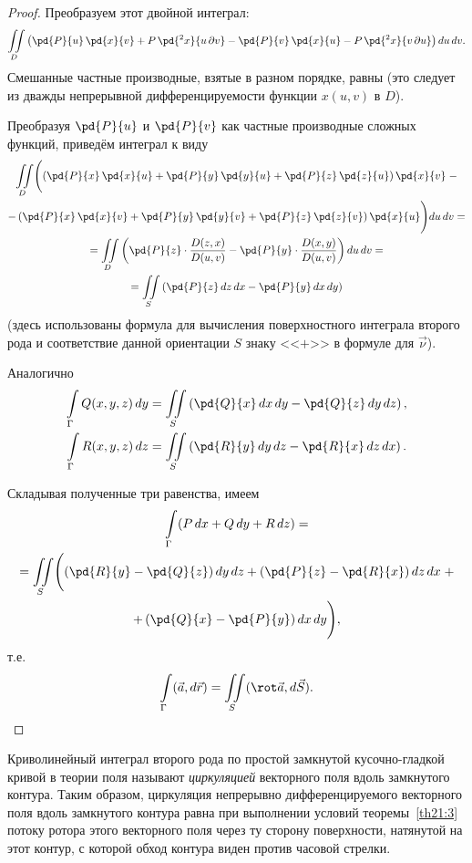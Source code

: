 \begin{proof}
Преобразуем этот двойной интеграл:
$$
\iint\limits_{D} \left(\pd{P}{u}\,\pd{x}{v} + P\,\pd{^2 x}{u\,\partial v} - \pd{P}{v}\,\pd{x}{u} - P\,\pd{^2 x}{v\,\partial u}\right) du\,dv.
$$
Смешанные частные производные, взятые в разном порядке, равны (это следует из дважды непрерывной дифференцируемости функции $x(u, v)$ в $D$).

Преобразуя $\pd{P}{u}$ и $\pd{P}{v}$ как частные производные сложных функций, приведём интеграл к виду
\begin{multline*}
\iint\limits_{D} \Biggl(\left(\pd{P}{x}\,\pd{x}{u} + \pd{P}{y}\,\pd{y}{u} + \pd{P}{z}\,\pd{z}{u}\right) \pd{x}{v} \; - \\
- \left(\pd{P}{x}\,\pd{x}{v} + \pd{P}{y}\,\pd{y}{v} + \pd{P}{z}\,\pd{z}{v}\right) \pd{x}{u} \Biggr) du\,dv = \\
= \iint\limits_{D} \left(\pd{P}{z} \cdot \frac{D(z, x)}{D(u, v)} - \pd{P}{y} \cdot \frac{D(x, y)}{D(u, v)}\right) du\,dv = \\
= \iint\limits_{S} \left(\pd{P}{z}\,dz\,dx - \pd{P}{y}\,dx\,dy\right)
\end{multline*}
(здесь использованы формула для вычисления поверхностного интеграла второго рода и соответствие данной ориентации $S$ знаку <<$+$>> в формуле для $\vec{\nu}$).

Аналогично
\begin{align*}
\int\limits_{\Gamma} Q(x, y, z)\,dy &= \iint\limits_{S} \left(\pd{Q}{x}\,dx\,dy - \pd{Q}{z}\,dy\,dz\right), \\
\int\limits_{\Gamma} R(x, y, z)\,dz &= \iint\limits_{S} \left(\pd{R}{y}\,dy\,dz - \pd{R}{x}\,dz\,dx\right).
\end{align*}

Складывая полученные три равенства, имеем
\begin{multline*}
\int\limits_{\Gamma} (P\,dx + Q\,dy + R\,dz) = \\
= \iint\limits_{S} \Biggl(\left(\pd{R}{y} - \pd{Q}{z}\right) dy\,dz + \left(\pd{P}{z} - \pd{R}{x}\right) dz\,dx \; + \\
+ \left(\pd{Q}{x} - \pd{P}{y}\right) dx\,dy \Biggr),
\end{multline*}
т.е.
$$
\int\limits_{\Gamma} (\vec{a}, d\vec{r}) = \iint\limits_{S} (\rot \vec{a}, d\vec{S}). 
$$
\end{proof}

\begin{notion}
Криволинейный интеграл второго рода по простой замкнутой кусочно-гладкой кривой в теории поля называют \textit{циркуляцией} векторного поля вдоль замкнутого контура. Таким образом, циркуляция непрерывно дифференцируемого векторного поля вдоль замкнутого контура равна при выполнении условий теоремы~\ref{th21:3} потоку ротора этого векторного поля через ту сторону поверхности, натянутой на этот контур, с которой обход контура виден против часовой стрелки.
\end{notion}

